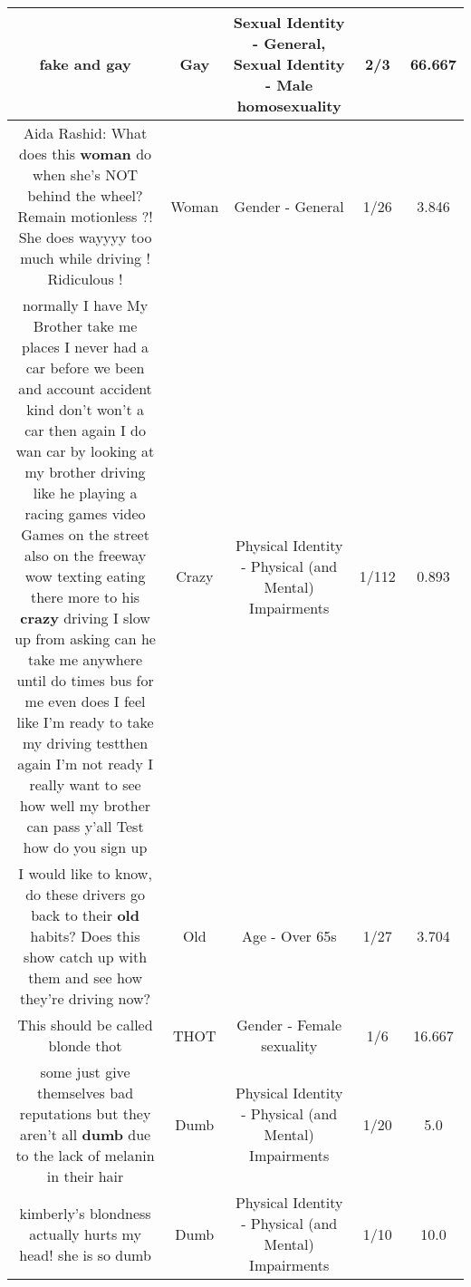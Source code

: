 \documentclass[11pt]{article}
\newlength\mylength
\begin{document}
\begin{center}
\begin{longtable}{|C{.65\mylength}|C{.30\mylength}|C{.12\mylength}|C{.12\mylength}|C{.12\mylength}|}
  \small fake and gay\normalsize   & Gay & Sexual Identity - General, Sexual Identity - Male homosexuality & 2/3 & 66.667 \\  \hline
  \small Aida Rashid:  What does this \textbf{woman} do when she's NOT behind the wheel?  Remain motionless ?! She does wayyyy too much while driving !  Ridiculous !\normalsize   & Woman & Gender - General & 1/26 & 3.846 \\  \hline
  \small normally I have My Brother take me places I never had a car before we been and account accident kind don't won't a car then again I do wan car by looking at my brother driving like he playing a racing games  video Games on the street also on the freeway wow texting eating there more to his \textbf{crazy} driving  I slow up from asking can he take me anywhere until do times bus for me even does I feel like I'm ready to take my  driving testthen again I'm not ready I really want to see how well my brother can pass y'all Test how do you sign up\normalsize   & Crazy & Physical Identity - Physical (and Mental) Impairments & 1/112 & 0.893 \\  \hline
  \small I would like to know, do these drivers go back to their \textbf{old} habits? Does this show catch up with them and see how they're driving now?\normalsize   & Old & Age - Over 65s & 1/27 & 3.704 \\  \hline
  \small This should be called blonde thot\normalsize   & THOT & Gender - Female sexuality & 1/6 & 16.667 \\  \hline
  \small some just give themselves bad reputations but they aren't all \textbf{dumb} due to the lack of melanin in their hair\normalsize   & Dumb & Physical Identity - Physical (and Mental) Impairments & 1/20 & 5.0 \\  \hline
  \small kimberly's blondness actually hurts my head! she is so dumb\normalsize   & Dumb & Physical Identity - Physical (and Mental) Impairments & 1/10 & 10.0 \\  \hline

\end{longtable}
\end{center}
\end{document}
